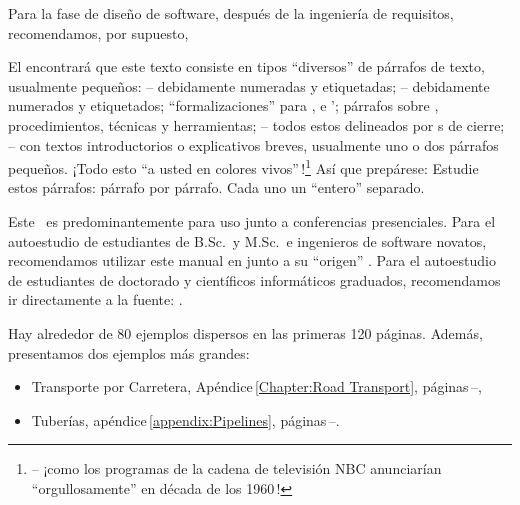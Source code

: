 \begynd
\pind Para la fase de diseño de software, después de la ingeniería de requisitos,
\pind recomendamos, por supuesto, \cite[
      ols.\,1--2]{TheSEBook1,TheSEBook2} 
\afslut

\label{The Structuring of The Text}

\begynd
\pind El  encontrará que este texto consiste en
      tipos ``diversos'' de párrafos de texto, usualmente pequeños:
\begynd
\pind {} -- debidamente numeradas y etiquetadas;
\pind {} -- debidamente numerados y etiquetados;
\pind ``formalizaciones'' para ,  e 
       ';
\pind párrafos sobre , procedimientos, técnicas y herramientas;
\pind -- todos estos delineados por {\dbsquare}s de cierre;
\pind -- con textos introductorios o explicativos breves, usualmente uno o dos párrafos pequeños.
\afslut
\pind ¡Todo esto  \textsf{``a usted en colores
  vivos''\,!}\footnote{\LLLL -- ¡como los programas de la cadena de televisión \textsf{NBC}
  anunciarían ``orgullosamente'' en década de los 1960\,!}
\pind Así que prepárese:
\begynd
\pind Estudie estos párrafos: párrafo por párrafo.
\pind Cada uno  un ``entero'' separado.
\afslut
\afslut


\label{sec:Used for Self-Study}

\begynd
\pind Este \manual\ es predominantemente para uso junto a conferencias presenciales.
\pind Para el autoestudio de estudiantes de B.Sc.\ y M.Sc.\ e
      ingenieros de software novatos, recomendamos utilizar este manual en
      junto a su ``origen'' \cite{BjornerMonograph2020}.
\pind Para el autoestudio de estudiantes de doctorado y científicos
      informáticos graduados, recomendamos ir directamente a la fuente:
      \cite{BjornerMonograph2020}.   
\afslut

\label{primer:Two Examples}

\begynd
\pind Hay alrededor de 80 ejemplos dispersos en las primeras 120 páginas.
\pind Además, presentamos dos ejemplos más grandes:
\afslut
\begin{itemize}
\item \textsf{Transporte por Carretera}, Apéndice\,\ref{Chapter:Road
        Transport}, páginas\,\pageref{Chapter:Road Transport}--\pageref{p-ch:Road Transport.n}, 
\item \textsf{Tuberías},
      apéndice\,\ref{appendix:Pipelines}, páginas\,\pageref{appendix:Pipelines}--\pageref{appendix:Pipelines.n}. 
\end{itemize}

